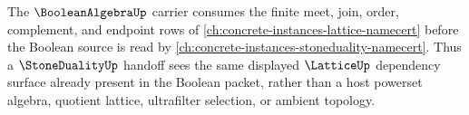The $\BooleanAlgebraUp$ carrier consumes the finite meet, join, order, complement, and endpoint rows of \autoref{ch:concrete-instances-lattice-namecert} before the Boolean source is read by \autoref{ch:concrete-instances-stoneduality-namecert}. Thus a $\StoneDualityUp$ handoff sees the same displayed $\LatticeUp$ dependency surface already present in the Boolean packet, rather than a host powerset algebra, quotient lattice, ultrafilter selection, or ambient topology.
